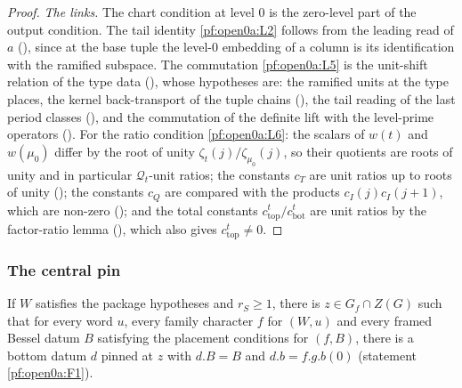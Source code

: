 \begin{proof}
\emph{The links.} The chart condition at level $0$ is the zero-level part of the output condition. The tail identity
\ref{pf:open0a:L2} follows from the leading read of $a$ (), since
at the base tuple the level-$0$ embedding of a column is its identification with the ramified subspace. The commutation
\ref{pf:open0a:L5} is the unit-shift relation of the type data
(), whose hypotheses are: the ramified units at the type
places, the kernel back-transport of the tuple chains
(), the tail reading of the last period classes
(), and the commutation of the definite lift with the
level-prime operators (). For the ratio condition
\ref{pf:open0a:L6}: the scalars of $w(t)$ and $w(\mu_0)$ differ by the root of unity $\zeta_t(j)/\zeta_{\mu_0}(j)$, so their
quotients are roots of unity and in particular $\mathcal Q_t$-unit ratios; the constants $c_T$ are unit ratios up to roots
of unity (); the constants $c_Q$ are compared with the products
$c_I(j)c_I(j+1)$, which are non-zero (); and the total constants
$c_{\mathrm{top}}^t/c_{\mathrm{bot}}^t$ are unit ratios by the factor-ratio lemma
(), which also gives $c_{\mathrm{top}}^t\ne0$.
\end{proof}

\subsubsection{The central pin}

\begin{proposition}\label{pf:open0a:botdat}
If $W$ satisfies the package hypotheses and $r_S\ge1$, there is $z\in G_f\cap Z(G)$ such that for every word $u$, every
family character $f$ for $(W,u)$ and every framed Bessel datum $B$ satisfying the placement conditions for $(f,B)$, there
is a bottom datum $d$ pinned at $z$ with $d.B=B$ and $d.b=f.g.b(0)$ (statement \ref{pf:open0a:F1}).
\end{proposition}

